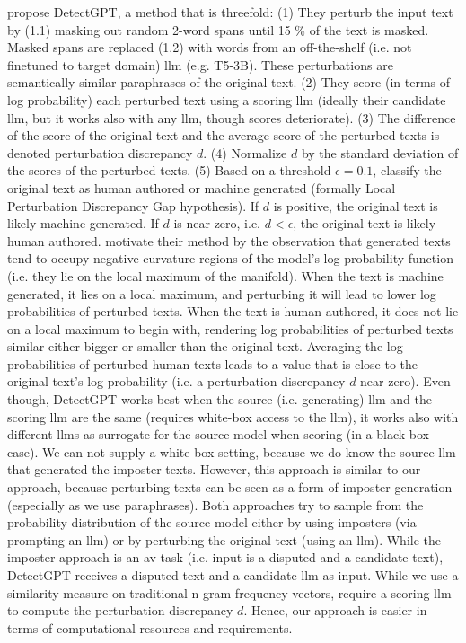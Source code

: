 \citet{mitchell_detectgpt_2023} propose DetectGPT, a method that is threefold:
(1) They perturb the input text by (1.1) masking out random 2-word spans until 15 \% of the text is masked. 
Masked spans are replaced (1.2) with words from an off-the-shelf (i.e. not finetuned to target domain) \ac{llm} (e.g. T5-3B). 
These perturbations are semantically similar paraphrases of the original text.
(2) They score (in terms of log probability) each perturbed text using a scoring \ac{llm} 
(ideally their candidate \ac{llm}, but it works also with any \ac{llm}, though scores deteriorate). 
(3) The difference of the score of the original text and the average score of the perturbed texts is denoted perturbation discrepancy $d$. 
(4) Normalize $d$ by the standard deviation of the scores of the perturbed texts.
(5) Based on a threshold $\epsilon=0.1$, classify the original text as human authored or machine generated 
(formally Local Perturbation Discrepancy Gap hypothesis).
If $d$ is positive, the original text is likely machine generated.
If $d$ is near zero, i.e. $d < \epsilon$, the original text is likely human authored.
\citet{mitchell_detectgpt_2023} motivate their method by the observation that generated texts tend to occupy 
negative curvature regions of the model's log probability function (i.e. they lie on the local maximum of the manifold).
When the text is machine generated, it lies on a local maximum, 
and perturbing it will lead to lower log probabilities of perturbed texts.
When the text is human authored, it does not lie on a local maximum to begin with, 
rendering log probabilities of perturbed texts similar either bigger or smaller than the original text.
Averaging the log probabilities of perturbed human texts leads to a value that is 
close to the original text's log probability (i.e. a perturbation discrepancy $d$ near zero).
Even though, DetectGPT works best when the source (i.e. generating) \ac{llm} and the scoring \ac{llm} are the same 
(requires white-box access to the \ac{llm}), 
it works also with different \acp{llm} as surrogate for the source model when scoring (in a black-box case).
We can not supply a white box setting, because we do know the source \ac{llm} that generated the imposter texts.
However, this approach is similar to our approach, because perturbing texts can be seen as a 
form of imposter generation (especially as we use paraphrases). 
Both approaches try to sample from the probability distribution of the source model either 
by using imposters (via prompting an \ac{llm}) or by perturbing the original text (using an \ac{llm}).
While the imposter approach is an \ac{av} task (i.e. input is a disputed and a candidate text), 
DetectGPT receives a disputed text and a candidate \ac{llm} as input.
While we use a similarity measure on traditional n-gram frequency vectors, 
\citet{mitchell_detectgpt_2023} require a scoring \ac{llm} to compute the perturbation discrepancy $d$.
Hence, our approach is easier in terms of computational resources and requirements.

